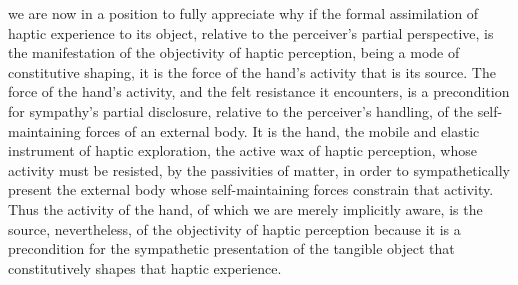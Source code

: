 \documentclass[12pt]{article}
\begin{document}
we are now in a position to fully appreciate why if the formal assimilation of haptic experience to its object, relative to the perceiver's partial perspective, is the manifestation of the objectivity of haptic perception, being a mode of constitutive shaping, it is the force of the hand's activity that is its source. The force of the hand's activity, and the felt resistance it encounters, is a precondition for sympathy's partial disclosure, relative to the perceiver's handling, of the self-maintaining forces of an external body. It is the hand, the mobile and elastic instrument of haptic exploration, the active wax of haptic perception, whose activity must be resisted, by the passivities of matter, in order to sympathetically present the external body whose self-maintaining forces constrain that activity. Thus the activity of the hand, of which we are merely implicitly aware, is the source, nevertheless, of the objectivity of haptic perception because it is a precondition for the sympathetic presentation of the tangible object that constitutively shapes that haptic experience.
 
\end{document}
